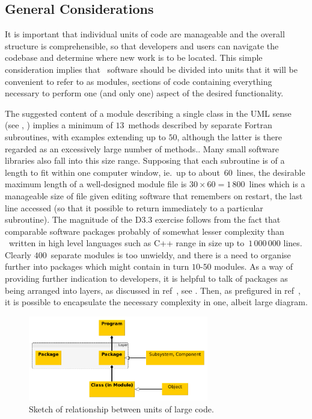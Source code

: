\subsection{General Considerations}\label{sec:considers}
It is important that individual
units of code are manageable and the overall structure is comprehensible,
so that developers and users can navigate the codebase and determine where new work is to be located.
This simple consideration implies that \nep\ software
should be divided into units that it will be convenient to refer
to as modules,
sections of code containing everything necessary to perform one (and only one)
aspect of the desired functionality.

The suggested content of a module
describing a single class in the UML sense (see , )
implies a minimum of $13$~methods described by separate Fortran subroutines,
with examples extending up to $50$, although the latter is there regarded as an excessively large
number of methods..
Many small software libraries also fall into this size range.
Supposing that each subroutine is of a length to fit within one computer window, ie.\
up to about~$60$~lines, the desirable maximum length of a well-designed module file is
$30\times60 = 1\,800$~lines which is a manageable size of file given 
editing software that remembers on restart, the last line accessed (so that it possible
to return immediately to a particular subroutine).
The magnitude of the D3.3 exercise follows from
the fact that comparable software packages probably of somewhat lesser complexity
than \nep\ written in high level languages such as C++ range in size up to~$1\,000\,000$ lines.
Clearly $400$~separate modules is too unwieldy, and there is a need to organise
further into packages which might contain in turn $10$-$50$ modules. 
As a way of providing further indication to developers,
it is helpful to talk of packages as being arranged into layers, as discussed
in ref~\cite[\S\S\,2.4,3.2]{y2re333}, see \Fig{hierarchygroup}.
Then, as prefigured in ref~\cite[Annex~A]{y2re333}, it is possible to encapsulate
the necessary complexity in one, albeit large diagram.
\begin{figure}
\centerline{\includegraphics[width=0.7\textwidth]{../png/hierarchygroup}}
\caption{
Sketch of relationship between units of large code.
\label{fig:hierarchygroup}}
\end{figure}

